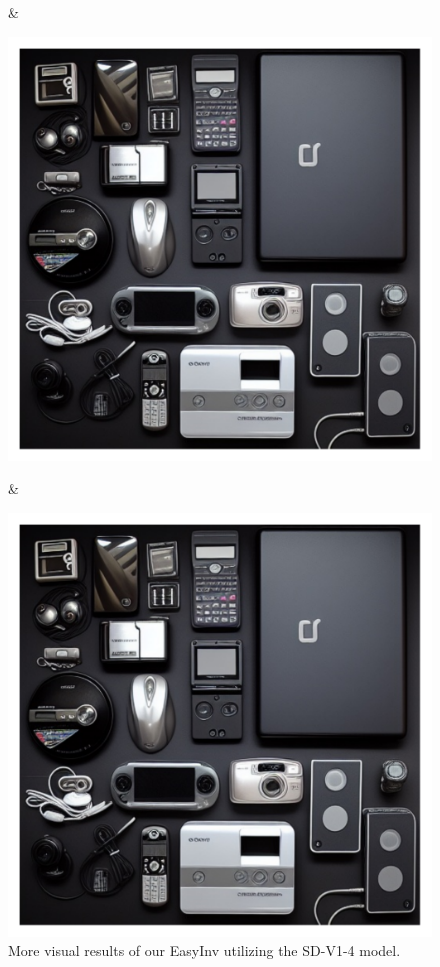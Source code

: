 \documentclass[letterpaper]{article} %
\begin{document}
\begin{figure}
\begin{tabular}
\begin{minipage}{\linewidth}
    \end{minipage} &
    \begin{minipage}{\linewidth}
        \includegraphics[width=\linewidth]{original_compare/1709.pdf}
    \end{minipage} &
    \begin{minipage}{\linewidth}
        \includegraphics[width=\linewidth]{Ours_compare/1709.pdf}
    \end{minipage}
\end{tabular}
\caption{More visual results of our EasyInv utilizing the SD-V1-4 model.}
\label{fig:compare_more}
\end{figure}
\end{document}
